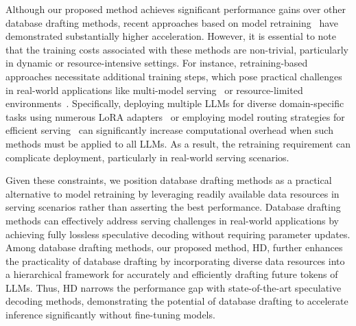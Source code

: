 


Although our proposed method achieves significant performance gains over other database drafting methods, recent approaches based on model retraining~\cite{MEDUSA, EAGLE2, Hydra} have demonstrated substantially higher acceleration.
However, it is essential to note that the training costs associated with these methods are non-trivial, particularly in dynamic or resource-intensive settings. 
For instance, retraining-based approaches necessitate additional training steps, which pose practical challenges in real-world applications like multi-model serving~\cite{SLoRA, OptCall} or resource-limited environments~\cite{Edge}. 
Specifically, deploying multiple LLMs for diverse domain-specific tasks using numerous LoRA adapters~\cite{SLoRA} or employing model routing strategies for efficient serving~\cite{OptCall} can significantly increase computational overhead when such methods must be applied to all LLMs. 
As a result, the retraining requirement can complicate deployment, particularly in real-world serving scenarios.

Given these constraints, we position database drafting methods as a practical alternative to model retraining by leveraging readily available data resources in serving scenarios rather than asserting the best performance. 
Database drafting methods can effectively address serving challenges in real-world applications by achieving fully lossless speculative decoding without requiring parameter updates. 
Among database drafting methods, our proposed method, HD, further enhances the practicality of database drafting by incorporating diverse data resources into a hierarchical framework for accurately and efficiently drafting future tokens of LLMs. Thus, HD narrows the performance gap with state-of-the-art speculative decoding methods, demonstrating the potential of database drafting to accelerate inference significantly without fine-tuning models.